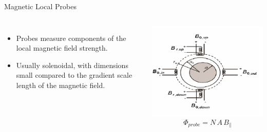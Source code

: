 \documentclass{beamer}
\begin{document}
\begin{frame}{Magnetic Local Probes} 
\begin{columns}
     	\begin{itemize}
		\item Probes measure components of the local magnetic field strength.
		\item Usually solenoidal, with dimensions small compared to the gradient scale length of the magnetic field.
	\end{itemize}
	\begin{center}
	\includegraphics[width=.6\columnwidth]{magProbes.png}
	$$\Phi_{probe} = N\, A\, B_{\parallel}$$
	\end{center}

\end{columns}
\end{frame}
\end{document}

